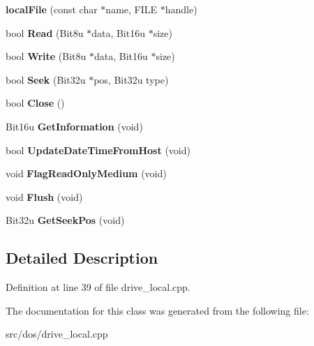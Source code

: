 \begin{DoxyCompactItemize}
\item 
\hypertarget{classlocalFile_ab28a6808847aceacff4d4405cb618bab}{{\bfseries local\-File} (const char $\ast$name, F\-I\-L\-E $\ast$handle)}\label{classlocalFile_ab28a6808847aceacff4d4405cb618bab}

\item 
\hypertarget{classlocalFile_a558f7d758b8818237b26722c466f0f49}{bool {\bfseries Read} (Bit8u $\ast$data, Bit16u $\ast$size)}\label{classlocalFile_a558f7d758b8818237b26722c466f0f49}

\item 
\hypertarget{classlocalFile_ac42aeb5a13b0db5f228ed529d793f435}{bool {\bfseries Write} (Bit8u $\ast$data, Bit16u $\ast$size)}\label{classlocalFile_ac42aeb5a13b0db5f228ed529d793f435}

\item 
\hypertarget{classlocalFile_ab661b8383ca8cf945056571ca982912a}{bool {\bfseries Seek} (Bit32u $\ast$pos, Bit32u type)}\label{classlocalFile_ab661b8383ca8cf945056571ca982912a}

\item 
\hypertarget{classlocalFile_a29a72ec4be5c9f3b0196f2f4d47f5f54}{bool {\bfseries Close} ()}\label{classlocalFile_a29a72ec4be5c9f3b0196f2f4d47f5f54}

\item 
\hypertarget{classlocalFile_a970064b86d4966929fae874542104cba}{Bit16u {\bfseries Get\-Information} (void)}\label{classlocalFile_a970064b86d4966929fae874542104cba}

\item 
\hypertarget{classlocalFile_a6ddb9040bcee2bfb3673228b47042e89}{bool {\bfseries Update\-Date\-Time\-From\-Host} (void)}\label{classlocalFile_a6ddb9040bcee2bfb3673228b47042e89}

\item 
\hypertarget{classlocalFile_a48ed18aa11972f7236cc34928387ff32}{void {\bfseries Flag\-Read\-Only\-Medium} (void)}\label{classlocalFile_a48ed18aa11972f7236cc34928387ff32}

\item 
\hypertarget{classlocalFile_a6fc67afa9e37a05b353d4376a714d495}{void {\bfseries Flush} (void)}\label{classlocalFile_a6fc67afa9e37a05b353d4376a714d495}

\item 
\hypertarget{classlocalFile_ac0b74c929048947e12d164a0430d32e2}{Bit32u {\bfseries Get\-Seek\-Pos} (void)}\label{classlocalFile_ac0b74c929048947e12d164a0430d32e2}

\end{DoxyCompactItemize}


\subsection{Detailed Description}


Definition at line 39 of file drive\-\_\-local.\-cpp.



The documentation for this class was generated from the following file\-:\begin{DoxyCompactItemize}
\item 
src/dos/drive\-\_\-local.\-cpp\end{DoxyCompactItemize}
